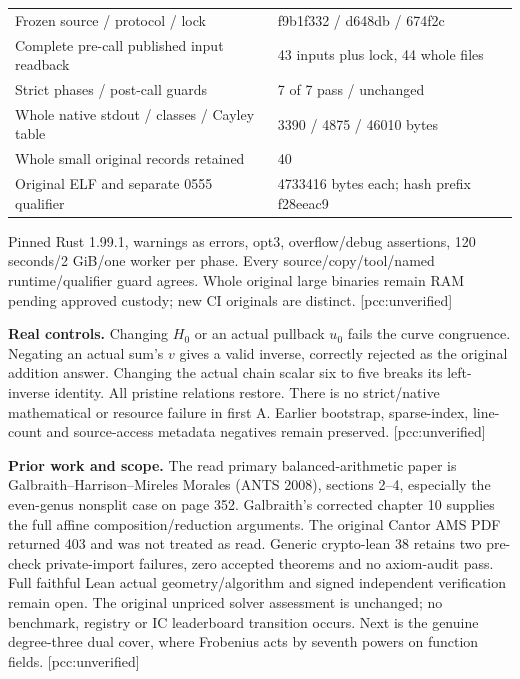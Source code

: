 \documentclass[10pt,a4paper]{article}
\begin{document}
\begin{center}\small
\begin{tabular}{ll}
\toprule
Frozen source / protocol / lock & f9b1f332 / d648db / 674f2c\\
Complete pre-call published input readback & 43 inputs plus lock, 44 whole files\\
Strict phases / post-call guards & 7 of 7 pass / unchanged\\
Whole native stdout / classes / Cayley table & 3390 / 4875 / 46010 bytes\\
Whole small original records retained & 40\\
Original ELF and separate 0555 qualifier & 4733416 bytes each; hash prefix f28eeac9\\
\bottomrule
\end{tabular}\end{center}
Pinned Rust 1.99.1, warnings as errors, opt3, overflow/debug assertions,
120 seconds/2 GiB/one worker per phase. Every source/copy/tool/named
runtime/qualifier guard agrees. Whole original large binaries remain
RAM pending approved custody; new CI originals are distinct.
[pcc:unverified]

\textbf{Real controls.} Changing $H_0$ or an actual pullback $u_0$ fails
the curve congruence. Negating an actual sum's $v$ gives a valid inverse,
correctly rejected as the original addition answer. Changing the actual
chain scalar six to five breaks its left-inverse identity. All pristine
relations restore. There is no strict/native mathematical or resource
failure in first A. Earlier bootstrap, sparse-index, line-count and
source-access metadata negatives remain preserved. [pcc:unverified]

\textbf{Prior work and scope.} The read primary balanced-arithmetic paper
is Galbraith--Harrison--Mireles Morales (ANTS 2008), sections 2--4,
especially the even-genus nonsplit case on page 352. Galbraith's corrected
chapter 10 supplies the full affine composition/reduction arguments.
The original Cantor AMS PDF returned 403 and was not treated as read.
Generic crypto-lean 38 retains two pre-check private-import failures,
zero accepted theorems and no axiom-audit pass. Full faithful Lean actual
geometry/algorithm and signed independent verification remain open.
The original unpriced solver assessment is unchanged; no benchmark,
registry or IC leaderboard transition occurs. Next is the genuine
degree-three dual cover, where Frobenius acts by seventh powers on
function fields. [pcc:unverified]
\end{document}
